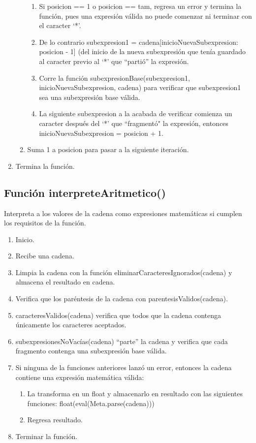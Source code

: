 \documentclass{article}
\begin{document}
\begin{enumerate}
\begin{enumerate}
\begin{enumerate}
            \item Si posicion == 1 o posicion == tam, regresa un error y termina la función, pues una expresión válida no puede comenzar ni terminar con el caracter ‘*’.
            \item De lo contrario subexpresion1 = cadena[inicioNuevaSubexpresion: posicion - 1]  (del inicio de la nueva subexpresión que tenía guardado al caracter previo al ‘*’ que “partió” la expresión.
            \item Corre la función subexpresionBase(subexpresion1, inicioNuevaSubexpresion, cadena) para verificar que subexpresion1 sea una subexpresión base válida.
            \item La siguiente subexpresion a la acabada de verificar comienza un caracter después del ‘*’ que “fragmentó" la expresión, entonces inicioNuevaSubexpresion = posicion + 1.
        \end{enumerate}
        \item Suma 1 a posicion para pasar a la siguiente iteración.
    \end{enumerate}
    \item Termina la función.
\end{enumerate}

\subsection{Función interpreteAritmetico()}
\normalsize Interpreta a los valores de la cadena como expresiones matemáticas si cumplen los requisitos de la función.
\begin{enumerate}
    \item Inicio.
    \item Recibe una cadena.
    \item Limpia la cadena con la función eliminarCaracteresIgnorados(cadena) y almacena el resultado en cadena.
    \item Verifica que los paréntesis de la cadena con parentesisValidos(cadena).
    \item caracteresValidos(cadena) verifica que todos que  la cadena contenga únicamente los caracteres aceptados.
    \item subexpresionesNoVacías(cadena) “parte” la cadena y verifica que cada fragmento contenga una subexpresión base válida.
    \item Si ninguna de la funciones anteriores lanzó un error, entonces la cadena contiene una expresión matemática válida:
    \begin{enumerate}
        \item La  transforma en un float  y almacenarlo en  resultado con las siguientes funciones: float(eval(Meta.parse(cadena)))
        \item Regresa resultado.
    \end{enumerate}
    \item Terminar la función.
\end{enumerate}
\end{document}
